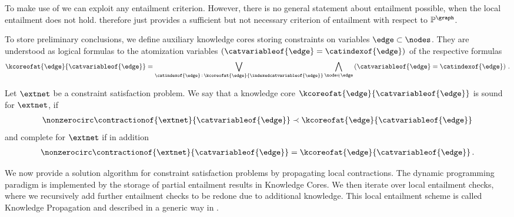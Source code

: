 \begin{remark}
    To make use of  we can exploit any entailment criterion.
    However, there is no general statement about entailment possible, when the local entailment does not hold.
     therefore just provides a sufficient but not necessary criterion of entailment with respect to $\probtensor^{\graph}$.
\end{remark}


To store preliminary conclusions, we define auxiliary knowledge cores storing constraints on variables $\edge\subset\nodes$.
They are understood as logical formulas to the atomization variables $\left(\catvariableof{\edge}=\catindexof{\edge}\right)$ of the respective formulas
\begin{align*}
    \kcoreofat{\edge}{\catvariableof{\edge}}
    = \bigvee_{\catindexof{\edge} \wcols \kcoreofat{\edge}{\indexedcatvariableof{\edge}}} \bigwedge_{\node\in\edge} \left(\catvariableof{\edge}=\catindexof{\edge}\right) \, .
\end{align*}

\begin{definition}\label{def:knowledgeCoreSoundComplete}
    Let $\extnet$ be a constraint satisfaction problem. %
    We say that a knowledge core $\kcoreofat{\edge}{\catvariableof{\edge}}$ is sound for $\extnet$, if
    \begin{align*}
        \nonzerocirc\contractionof{\extnet}{\catvariableof{\edge}}  \prec \kcoreofat{\edge}{\catvariableof{\edge}}
    \end{align*}
    and complete for $\extnet$ if in addition
    \begin{align*}
        \nonzerocirc\contractionof{\extnet}{\catvariableof{\edge}}=\kcoreofat{\edge}{\catvariableof{\edge}} \, .
    \end{align*}
\end{definition}



We now provide a solution algorithm for constraint satisfaction problems by propagating local contractions.
The dynamic programming paradigm is implemented by the storage of partial entailment results in Knowledge Cores.
We then iterate over local entailment checks, where we recursively add further entailment checks to be redone due to additional knowledge.
This local entailment scheme is called Knowledge Propagation and described in a generic way in .

